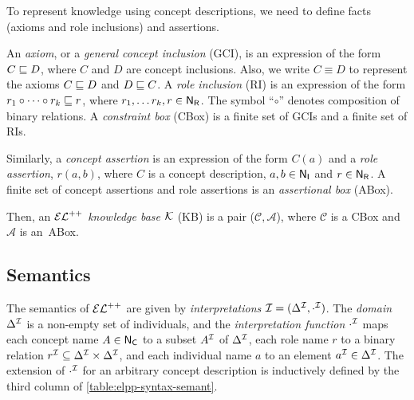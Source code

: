 To represent knowledge using concept descriptions, we need to define facts (axioms and role inclusions) and assertions.

An \emph{axiom}, or a \emph{general concept inclusion} (GCI), is an expression of the form $C \sqsubseteq D$, where $C$ and $D$ are concept inclusions. Also, we write $C \equiv D$ to represent the axioms $C \sqsubseteq D$ and $D \sqsubseteq C$. A \emph{role inclusion} (RI) is an expression of the form $r_1 \circ \cdots \circ r_k \sqsubseteq r$, where $r_1, \dots r_k, r \in \mathsf{N_R}$.  The symbol ``$\circ$'' denotes composition of binary relations. A \emph{constraint box} (CBox) is a finite set of GCIs and a finite set of RIs.

Similarly, a \emph{concept assertion} is an expression of the form $C(a)$ and a \emph{role assertion}, $r(a, b)$, where $C$ is a concept description, $a, b \in \mathsf{N_I}$ and $r \in \mathsf{N_R}$. A finite set of concept assertions and role assertions is an \emph{assertional box} (ABox).

Then, an $\mathcal{EL}^{++}$ \emph{knowledge base} $\mathcal{K}$ (KB) is a pair ($\mathcal{C}, \mathcal{A}$), where $\mathcal{C}$ is a CBox and $\mathcal{A}$ is an~ABox.

\subsection{Semantics}
The semantics of $\mathcal{EL}^{++}$ are given by \emph{interpretations} $\mathcal{I} = (\Delta^{\mathcal{I}}, \cdot^{\mathcal{I}})$. The \emph{domain} $\Delta^{\mathcal{I}}$ is a non-empty set of individuals, and the \emph{interpretation function} $\cdot^{\mathcal{I}}$ maps each concept name $A \in \mathsf{N_C}$ to a subset $A^{\mathcal{I}}$ of $\Delta^{\mathcal{I}}$, each role name $r$ to a binary relation $r^{\mathcal{I}} \subseteq \Delta^{\mathcal{I}} \times \Delta^{\mathcal{I}}$, and each individual name $a$ to an element $a^{\mathcal{I}} \in \Delta^{\mathcal{I}}$. The extension of $\cdot^{\mathcal{I}}$ for an arbitrary concept description is inductively defined by the third column of \cref{table:elpp-syntax-semant}.

